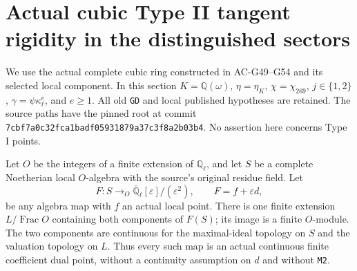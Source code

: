 \section{Actual cubic Type II tangent rigidity in the distinguished sectors}
\label{sec:cubic-typeii-rigidity}

We use the actual complete cubic ring constructed in
AC-G49--G54 and its selected local component.  In this section
$K=\mathbb Q(\omega)$, $\eta=\eta_K$, $\chi=\chi_{269}$,
$j\in\{1,2\}$, $\gamma=\psi\kappa_\ell^e$, and
$e\ge1$.  All old \texttt{GD} and local published hypotheses
are retained.  The source paths have the pinned root
at commit \texttt{7cbf7a0c32fca1badf05931879a37c3f8a2b03b4}.
No assertion here concerns Type I points.

\begin{lemma}
\label{AC-G62-cont}
Let $O$ be the integers of a finite extension of
$\mathbb Q_\ell$, and let $S$ be a complete Noetherian
local $O$-algebra with the source's original residue field.
Let
\[
 F:S\longrightarrow_O\overline{\mathbb Q}_\ell
                         [\varepsilon]/(\varepsilon^2),
       \qquad F=f+\varepsilon d,                         \tag{G62.1}
\]
be any algebra map with $f$ an actual local point.
There is one finite extension $L/\operatorname{Frac}O$
containing both components of $F(S)$; its image is a finite
$O$-module.  The two components are continuous for the
maximal-ideal topology on $S$ and the valuation topology on
$L$.  Thus every such map is an actual continuous finite
coefficient dual point, without a continuity assumption on
$d$ and without \texttt{M2}.
\end{lemma}
